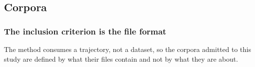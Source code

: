 
\subsection{Corpora}
\label{sec:corpora}
\label{sec:cohorts}

\subsubsection{The inclusion criterion is the file format}

The method consumes a trajectory, not a dataset, so the corpora admitted to this study are defined
by what their files contain and not by what they are about.

